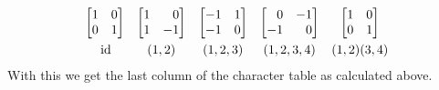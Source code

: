 \begin{example}
  \[
    \begin{array}{ccccc}
        \begin{bmatrix*}[r]
          1 & 0 \\
          0 & 1
        \end{bmatrix*}
      & \begin{bmatrix*}[r]
          1 &  0  \\
          1 & -1
        \end{bmatrix*}
      & \begin{bmatrix*}[r]
          -1  & 1 \\
          -1  & 0
        \end{bmatrix*}
      & \begin{bmatrix*}[r]
           0  & -1 \\
          -1  &  0
        \end{bmatrix*}
      & \begin{bmatrix*}[r]
          1 & 0 \\
          0 & 1
        \end{bmatrix*}
      \\
        \rule{0pt}{1.2em}
        \id
      & (1,2)
      & (1,2,3)
      & (1,2,3,4)
      & (1,2)(3,4)
    \end{array}
  \]
  With this we get the last column of the character table as calculated above.
\end{example}










